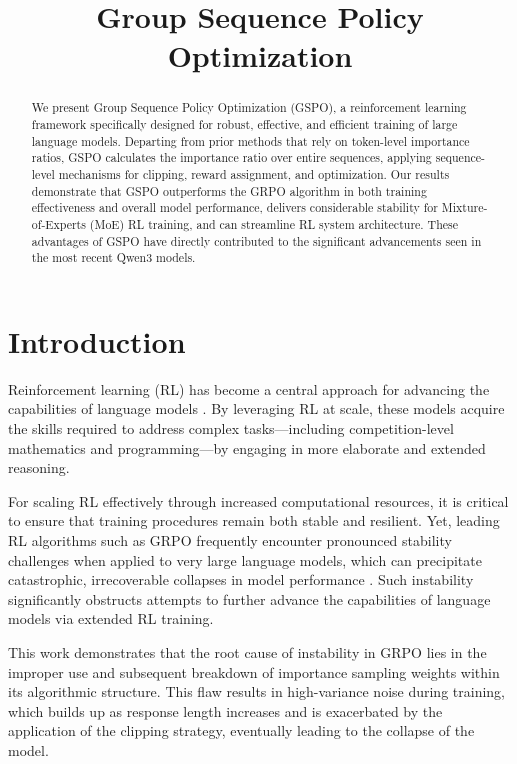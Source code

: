 \title{Group Sequence Policy Optimization}

\begin{abstract}
We present Group Sequence Policy Optimization (GSPO), a reinforcement learning framework specifically designed for robust, effective, and efficient training of large language models. Departing from prior methods that rely on token-level importance ratios, GSPO calculates the importance ratio over entire sequences, applying sequence-level mechanisms for clipping, reward assignment, and optimization. Our results demonstrate that GSPO outperforms the GRPO algorithm in both training effectiveness and overall model performance, delivers considerable stability for Mixture-of-Experts (MoE) RL training, and can streamline RL system architecture. These advantages of GSPO have directly contributed to the significant advancements seen in the most recent Qwen3 models.
\end{abstract}

\section{Introduction}
\label{sec:intro}

Reinforcement learning (RL) has become a central approach for advancing the capabilities of language models \citep{o1,dpsk-r1,qwq32b,qwen3}. By leveraging RL at scale, these models acquire the skills required to address complex tasks—including competition-level mathematics and programming—by engaging in more elaborate and extended reasoning.

For scaling RL effectively through increased computational resources, it is critical to ensure that training procedures remain both stable and resilient. Yet, leading RL algorithms such as GRPO \citep{grpo} frequently encounter pronounced stability challenges when applied to very large language models, which can precipitate catastrophic, irrecoverable collapses in model performance \citep{qwen3, minimax-m1}. Such instability significantly obstructs attempts to further advance the capabilities of language models via extended RL training.

This work demonstrates that the root cause of instability in GRPO lies in the improper use and subsequent breakdown of importance sampling weights within its algorithmic structure. This flaw results in high-variance noise during training, which builds up as response length increases and is exacerbated by the application of the clipping strategy, eventually leading to the collapse of the model.

